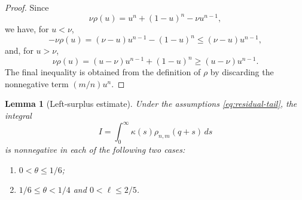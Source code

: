 \documentclass[11pt]{article}
\newtheorem{lemma}[theorem]{Lemma}
\begin{document}
\begin{proof}
Since
\[
        \nu\rho(u)=u^n+(1-u)^n-\nu u^{n-1},
\]
we have, for $u<\nu$,
\[
        -\nu\rho(u)=(\nu-u)u^{n-1}-(1-u)^n\le(\nu-u)u^{n-1},
\]
and, for $u>\nu$,
\[
        \nu\rho(u)=(u-\nu)u^{n-1}+(1-u)^n\ge(u-\nu)u^{n-1}.
\]
The final inequality is obtained from the definition of $\rho$ by discarding the nonnegative term $(m/n)u^n$.
\end{proof}

\begin{lemma}[Left-surplus estimate]\label{lem:left-surplus-tail}
Under the assumptions \eqref{eq:residual-tail}, the integral
\[
        I=\int_0^\infty \kappa(s)\rho_{n,m}(q+s)\,ds
\]
is nonnegative in each of the following two cases:
\begin{enumerate}[label=\textup{(\alph*)}]
\item $0<\theta\le1/6$;
\item $1/6\le\theta<1/4$ and $0<\ell\le2/5$.
\end{enumerate}
\end{lemma}
\end{document}
